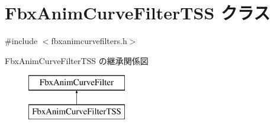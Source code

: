 \hypertarget{class_fbx_anim_curve_filter_t_s_s}{}\section{Fbx\+Anim\+Curve\+Filter\+T\+SS クラス}
\label{class_fbx_anim_curve_filter_t_s_s}


{\ttfamily \#include $<$fbxanimcurvefilters.\+h$>$}

Fbx\+Anim\+Curve\+Filter\+T\+SS の継承関係図\begin{figure}[H]
\begin{center}
\leavevmode
\includegraphics[height=2.000000cm]{class_fbx_anim_curve_filter_t_s_s}
\end{center}
\end{figure}
